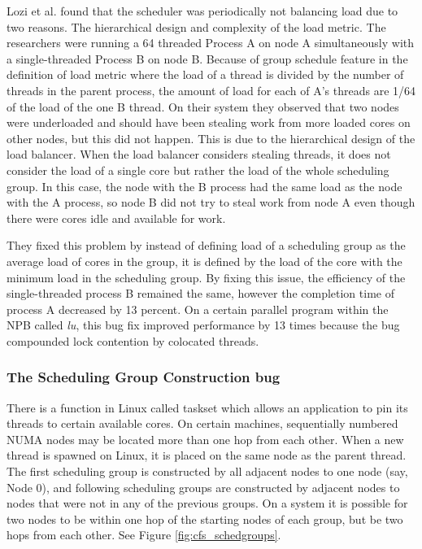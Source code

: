 \documentclass{sig-alternate}
\begin{document}
Lozi et al. found that the scheduler was periodically not balancing load due to two reasons. The hierarchical design and complexity of the load metric. The researchers were running a 64 threaded Process A on node A simultaneously with a single-threaded Process B on node B. Because of group schedule feature in the definition of load metric where the load of a thread is divided by the number of threads in the parent process, the amount of load for each of A's threads are 1/64 of the load of the one B thread. On their system they observed that two nodes were underloaded and should have been stealing work from more loaded cores on other nodes, but this did not happen. This is due to the hierarchical design of the load balancer. When the load balancer considers stealing threads, it does not consider the load of a single core but rather the load of the whole scheduling group. In this case, the node with the B process had the same load as the node with the A process, so node B did not try to steal work from node A even though there were cores idle and available for work.~\cite{Lozi:2016}

They fixed this problem by instead of defining load of a scheduling group as the average load of cores in the group, it is defined by the load of the core with the minimum load in the scheduling group. By fixing this issue, the efficiency of the single-threaded process B remained the same, however the completion time of process A decreased by 13 percent. On a certain parallel program within the NPB called \textit{lu}, this bug fix improved performance by 13 times because the bug compounded lock contention by colocated threads.~\cite{Lozi:2016}

\subsubsection{The Scheduling Group Construction bug}
\label{sec:cfsfault_grpconstruct}

There is a function in Linux called taskset which allows an application to pin its threads to certain available cores. On certain machines, sequentially numbered NUMA nodes may be located more than one hop from each other. When a new thread is spawned on Linux, it is placed on the same node as the parent thread. The first scheduling group is constructed by all adjacent nodes to one node (say, Node 0), and following scheduling groups are constructed by adjacent nodes to nodes that were not in any of the previous groups. On a system it is possible for two nodes to be within one hop of the starting nodes of each group, but be two hops from each other. See Figure \ref{fig:cfs_schedgroups}.~\cite{Lozi:2016}
\end{document}
